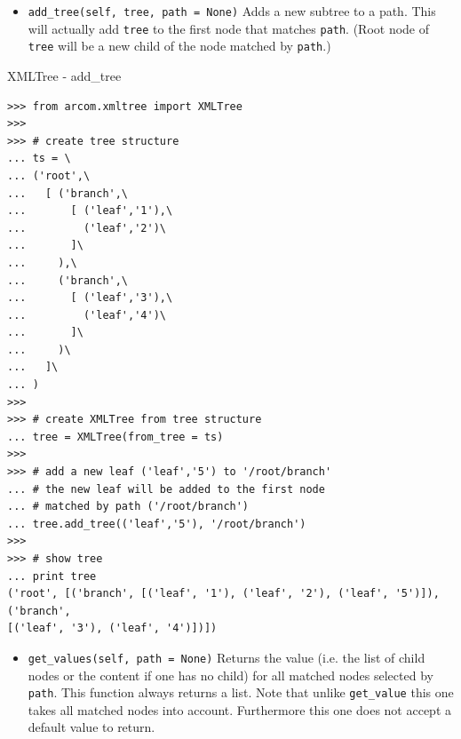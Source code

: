 \documentclass{article}
\begin{document}
\begin{flushleft}
\begin{itemize}
{    \begin{itemize}
      \item{ \verb$add_tree(self, tree, path = None)$ \linebreak
      Adds a new subtree to a path. This will actually add \verb$tree$ to the first node that matches \verb$path$.
      (Root node of \verb$tree$ will be a new child of the node matched by \verb$path$.)
      }
    \end{itemize}

    \begin{example}
      \caption{XMLTree - add\_tree}\label{xtaddtree}
\begin{verbatim}
>>> from arcom.xmltree import XMLTree
>>> 
>>> # create tree structure
... ts = \
... ('root',\
...   [ ('branch',\
...       [ ('leaf','1'),\
...         ('leaf','2')\
...       ]\
...     ),\
...     ('branch',\
...       [ ('leaf','3'),\
...         ('leaf','4')\
...       ]\
...     )\
...   ]\
... )
>>> 
>>> # create XMLTree from tree structure
... tree = XMLTree(from_tree = ts)
>>> 
>>> # add a new leaf ('leaf','5') to '/root/branch'
... # the new leaf will be added to the first node 
... # matched by path ('/root/branch') 
... tree.add_tree(('leaf','5'), '/root/branch')
>>> 
>>> # show tree
... print tree
('root', [('branch', [('leaf', '1'), ('leaf', '2'), ('leaf', '5')]), ('branch', 
[('leaf', '3'), ('leaf', '4')])])
\end{verbatim}
    \end{example}

    \begin{itemize}
      \item{ \verb$get_values(self, path = None)$ \linebreak
      Returns the value (i.e. the list of child nodes or the content if one has no child) 
      for all matched nodes selected by \verb$path$. This function always returns a list.
      Note that unlike \verb$get_value$ this one takes all matched nodes into account.
      Furthermore this one does not accept a default value to return.
      }
    \end{itemize}

}
\end{itemize}
\end{flushleft}
\end{document}
